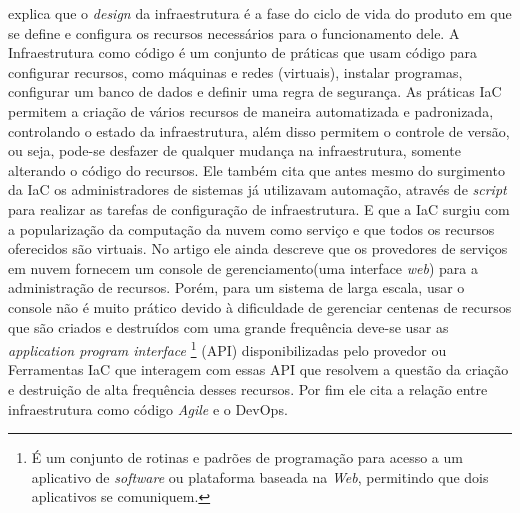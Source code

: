  explica que o \textit{design} da infraestrutura é a fase do ciclo de vida do produto em que se define e configura os recursos necessários para o funcionamento dele. A Infraestrutura como código é um conjunto de práticas que usam código para configurar recursos, como máquinas e redes (virtuais), instalar programas, configurar um banco de dados e definir uma regra de segurança. As práticas IaC permitem a criação de vários recursos de maneira automatizada e padronizada, controlando o estado da infraestrutura, além disso permitem o controle de versão, ou seja, pode-se desfazer de qualquer mudança na infraestrutura, somente alterando o código do recursos. Ele também cita que antes mesmo do surgimento da IaC os administradores de sistemas já utilizavam automação, através de \textit{script} para realizar as tarefas de configuração de infraestrutura. E que a IaC surgiu com a popularização da computação da nuvem como serviço e que todos os recursos oferecidos são virtuais. No artigo ele ainda descreve que os provedores de serviços em nuvem fornecem um console de gerenciamento(uma interface \textit{web}) para a administração de recursos. Porém, para um sistema de larga escala, usar o console não é muito prático devido à dificuldade de gerenciar centenas de recursos que são criados e destruídos com uma grande frequência deve-se usar as \textit{application program interface} \footnote{É um conjunto de rotinas e padrões de programação para acesso a um aplicativo de \textit{software} ou plataforma baseada na \textit{Web}, permitindo que dois aplicativos se comuniquem. } (API) disponibilizadas pelo provedor ou Ferramentas IaC  que interagem com essas API que resolvem a questão da criação e destruição de alta frequência desses recursos. Por fim ele cita a relação entre infraestrutura como código \textit{Agile} e o DevOps. 

\hfill

